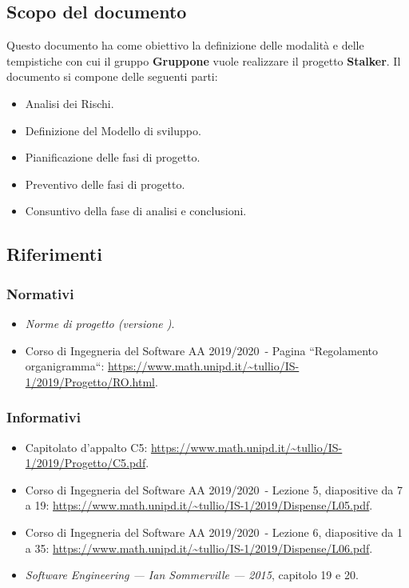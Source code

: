 \documentclass[../piano-di-progetto.tex]{subfiles}
\begin{document}
\subsection{Scopo del documento}%
\label{sub:scopo_del_documento}
Questo documento ha come obiettivo la definizione delle modalità e delle tempistiche con cui il gruppo \textbf{Gruppone} vuole realizzare il progetto \textbf{Stalker}.
Il documento si compone delle seguenti parti:
\begin{itemize}
  \item Analisi dei Rischi.
  \item Definizione del Modello di sviluppo.
  \item Pianificazione delle fasi di progetto.
  \item Preventivo delle fasi di progetto.
  \item Consuntivo della fase di analisi e conclusioni.
\end{itemize}

\scopoDelProdottoEGlossario{}

\subsection{Riferimenti}%
\label{sub:riferimenti}
\subsubsection{Normativi}%
\label{subs:normativi}
\begin{itemize}
  \item \textit{Norme di progetto (versione \versione)}.
  \item Corso di Ingegneria del Software AA 2019/2020~- Pagina ``Regolamento organigramma``: \href{https://www.math.unipd.it/~tullio/IS-1/2019/Progetto/RO.html}{https://www.math.unipd.it/\textasciitilde tullio/IS-1/2019/Progetto/RO.html}.
\end{itemize}
\subsubsection{Informativi}%
\label{subs:informativi}
\begin{itemize}
  \item Capitolato d'appalto C5: \href{https://www.math.unipd.it/~tullio/IS-1/2019/Progetto/C5.pdf}{https://www.math.unipd.it/\textasciitilde tullio/IS-1/2019/Progetto/C5.pdf}.
  \item Corso di Ingegneria del Software AA 2019/2020~- Lezione 5, diapositive da 7 a 19: \href{https://www.math.unipd.it/~tullio/IS-1/2019/Dispense/L05.pdf}{https://www.math.unipd.it/\textasciitilde tullio/IS-1/2019/Dispense/L05.pdf}.
  \item Corso di Ingegneria del Software AA 2019/2020~- Lezione 6, diapositive da 1 a 35: \href{https://www.math.unipd.it/~tullio/IS-1/2019/Dispense/L06.pdf}{https://www.math.unipd.it/\textasciitilde tullio/IS-1/2019/Dispense/L06.pdf}.
  \item \textit{Software Engineering --- Ian Sommerville --- 2015}, capitolo 19 e 20.
\end{itemize}%
\end{document}
